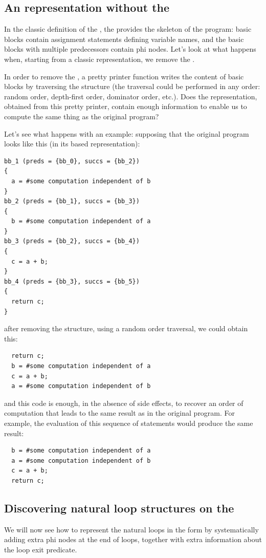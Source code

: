 \subsection{An \SSA{} representation without the \CFG{}}

In the classic definition of the \SSA{}, the \CFG{} provides the
skeleton of the program: basic blocks contain assignment statements
defining \SSA{} variable names, and the basic blocks with multiple
predecessors contain phi nodes.  Let's look at what happens when,
starting from a classic \SSA{} representation, we remove the \CFG{}.

In order to remove the \CFG{}, a pretty printer function writes the
content of basic blocks by traversing the \CFG{} structure (the \CFG{}
traversal could be performed in any order: random order, depth-first
order, dominator order, etc.).  Does the representation, obtained from
this pretty printer, contain enough information to enable us to
compute the same thing as the original program?

Let's see what happens with an example: supposing that the original
program looks like this (in its \CFG{} based \SSA{} representation):
\begin{verbatim}
bb_1 (preds = {bb_0}, succs = {bb_2})
{
  a = #some computation independent of b
}
bb_2 (preds = {bb_1}, succs = {bb_3})
{
  b = #some computation independent of a
}
bb_3 (preds = {bb_2}, succs = {bb_4})
{
  c = a + b;
}
bb_4 (preds = {bb_3}, succs = {bb_5})
{
  return c;
}
\end{verbatim}
after removing the \CFG{} structure, using a random order traversal,
we could obtain this:
\begin{verbatim}
  return c;
  b = #some computation independent of a
  c = a + b;
  a = #some computation independent of b
\end{verbatim}
and this \SSA{} code is enough, in the absence of side effects, to
recover an order of computation that leads to the same result as in
the original program.  For example, the evaluation of this sequence of
statements would produce the same result:
\begin{verbatim}
  b = #some computation independent of a
  a = #some computation independent of b
  c = a + b;
  return c;
\end{verbatim}

\subsection{Discovering natural loop structures on the \SSA{}}
We will now see how to represent the natural loops in the \SSA{} form
by systematically adding extra phi nodes at the end of loops, together
with extra information about the loop exit predicate.

